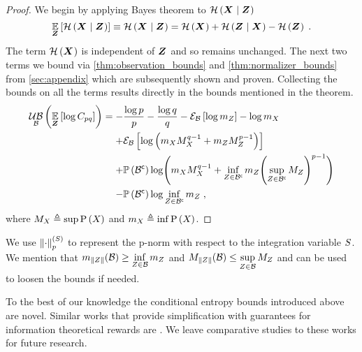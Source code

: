 \begin{proof}
	We begin by applying Bayes theorem to $\mathcal{H}\left({\boldsymbol X_{}}\mid{\ensuremath{\boldsymbol Z_{}}}\right)$
	\begin{equation}
		\operatorname*{\mathbb{E}}\limits_{\boldsymbol Z_{}}\left[{\mathcal{H}\left({\boldsymbol X_{}}\mid{\ensuremath{\boldsymbol Z_{}}}\right)}\right]\equiv\mathcal{H}\left({\boldsymbol X_{}}\mid{\ensuremath{\boldsymbol Z_{}}}\right)=\mathcal{H}\left({\boldsymbol X_{}}\right)+\mathcal{H}\left({\boldsymbol Z_{}}\mid{\ensuremath{\boldsymbol X_{}}}\right)-\mathcal{H}\left({\boldsymbol Z_{}}\right)\;.
	\end{equation}
	The term $\mathcal{H}\left({\boldsymbol X_{}}\right)$ is independent of $\boldsymbol Z_{}$ and so remains unchanged. The next two terms we bound via \autoref{thm:observation_bounds} and \autoref{thm:normalizer_bounds} from \cref{sec:appendix} which are subsequently shown and proven. Collecting the bounds on all the terms results directly in the bounds mentioned in the theorem.
	\begin{equation*}
		\begin{split}
			\upperbound_\subSpace\left(\expectation{\log C_{pq}}{\observationsRV{}}\right)&=-\frac{\log p}{p}-\frac{\log q}{q}-\partialexpectation{\log m_{\observations{}}}{\subSpace}-\log m_{\states{}}\\
			&\phantomeq+ \partialexpectation{\log\left(m_{\states{}}M_{\states{}}^{q-1}+m_{\observations{}}M_{\observations{}}^{p-1}\right)}{\subSpace}\\
			&\phantomeq+\measure{\stcomp{\subSpace}}\log\Biggl( m_{\states{}}M_{\states{}}^{q-1}+\inf_{\observations{}\in\stcomp{\subSpace}}m_{\observations{}}\Biggl(\sup_{\observations{}\in\stcomp{\subSpace}}M_{\observations{}}\Biggr)^{p-1}\Biggr) \\
			&\phantomeq-\measure{\stcomp{\subSpace}}\log\inf_{\observations{}\in\stcomp{\subSpace}}m_{\observations{}}\;,
		\end{split}
	\end{equation*}
	where $M_{X_{}}\triangleq\sup\mathrm{P}\left({X_{}}\right)$ and $m_{X_{}}\triangleq\inf\mathrm{P}\left({X_{}}\right)$.
\end{proof}
We use $\left\lVert\cdot\right\rVert_{p}^{(S)}$ to represent the p-norm with respect to the integration variable $S$. We mention that $m_{\lVert Z_{}\rVert}(\mathcal B)\geq \inf\limits_{Z_{}\in\mathcal B}m_{Z_{}}$ and $M_{\lVert Z_{}\rVert}(\mathcal B)\leq \sup\limits_{Z_{}\in\mathcal B}M_{Z_{}}$ and can be used to loosen the bounds if needed.

To the best of our knowledge the conditional entropy bounds introduced above are novel. Similar works that provide simplification with guarantees for information theoretical rewards are \cite{Sztyglic22iros,Barenboim22ijcai,Yotam24tro}. We leave comparative studies to these works for future research.

